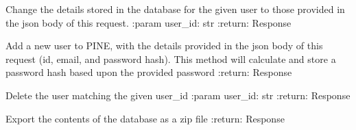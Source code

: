 \documentclass[letterpaper,10pt,english]{sphinxmanual}
\begin{document}

\begin{fulllineitems}
\label{\detokenize{autoapi/pine/backend/admin/bp/index:pine.backend.admin.bp.update_user}}
\sphinxAtStartPar
Change the details stored in the database for the given user to those provided in the json body of this request.
:param user\_id: str
:return: Response

\end{fulllineitems}


\begin{fulllineitems}
\label{\detokenize{autoapi/pine/backend/admin/bp/index:pine.backend.admin.bp.add_user}}
\sphinxAtStartPar
Add a new user to PINE, with the details provided in the json body of this request (id, email, and password hash).
This method will calculate and store a password hash based upon the provided password
:return: Response

\end{fulllineitems}


\begin{fulllineitems}
\label{\detokenize{autoapi/pine/backend/admin/bp/index:pine.backend.admin.bp.delete_user}}
\sphinxAtStartPar
Delete the user matching the given user\_id
:param user\_id: str
:return: Response

\end{fulllineitems}


\begin{fulllineitems}
\label{\detokenize{autoapi/pine/backend/admin/bp/index:pine.backend.admin.bp.system_export}}
\sphinxAtStartPar
Export the contents of the database as a zip file
:return: Response

\end{fulllineitems}
\end{document}
